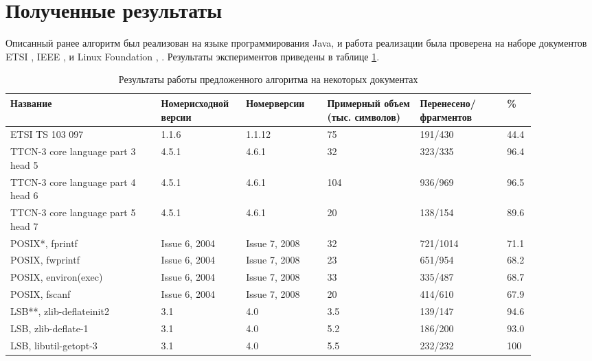 \section{Полученные результаты}
\label{sec:Chapter5} 

Описанный ранее алгоритм был реализован на языке программирования Java, и работа реализации была проверена на наборе документов ETSI \cite{web:etsi461}, IEEE \cite{web:POSIX2004}, \cite{web:POSIX2008} и Linux Foundation \cite{web:LSB3}, \cite{web:LSB4}. Результаты экспериментов приведены в таблице \ref{tabular:results}.

\begin{table}[H]
\caption{Результаты работы предложенного алгоритма на некоторых документах}
\label{tabular:results}
\begin{center}
\begin{tabular}{|p{0.26\linewidth}|p{0.14\linewidth}|p{0.14\linewidth}|p{0.16\linewidth}|p{0.15\linewidth}|p{0.04\linewidth}|}
\hline
\textbf{Название} & \textbf{Номер\newline исходной версии} & \textbf{Номер\newline версии} & \textbf{Примерный объем (тыс. символов)} & \textbf{Перенесено/\newline фрагментов} & \textbf{\%} \\
\hline
ETSI TS 103 097 & 1.1.6 & 1.1.12 & 75 & 191/430 &  44.4\\
\hline
TTCN-3 core language part 3 head 5 & 4.5.1 & 4.6.1 & 32 & 323/335 & 96.4\\
\hline
TTCN-3 core language part 4 head 6 & 4.5.1 & 4.6.1 & 104 & 936/969 & 96.5\\
\hline
TTCN-3 core language part 5 head 7 & 4.5.1 & 4.6.1 & 20 & 138/154 & 89.6\\
\hline
POSIX*, fprintf & Issue 6, 2004 & Issue 7, 2008 & 32 & 721/1014 & 71.1\\
\hline
POSIX, fwprintf & Issue 6, 2004 & Issue 7, 2008 & 23 & 651/954 & 68.2\\
\hline
POSIX, environ(exec) & Issue 6, 2004 & Issue 7, 2008 & 33 & 335/487 & 68.7\\
\hline
POSIX, fscanf & Issue 6, 2004 & Issue 7, 2008 & 20 & 414/610 & 67.9\\
\hline
LSB**, zlib-deflateinit2 & 3.1 & 4.0 & 3.5 & 139/147 & 94.6\\
\hline
LSB, zlib-deflate-1 & 3.1 & 4.0 & 5.2 & 186/200 & 93.0\\
\hline
LSB, libutil-getopt-3 & 3.1 & 4.0 & 5.5 & 232/232 & 100\\

\end{tabular}
\end{center}
\end{table}
